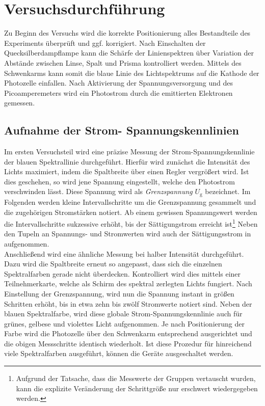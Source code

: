 \section{Versuchsdurchführung}
\label{sec:Versuchsdurchfuehrung}

Zu Beginn des Versuchs wird die korrekte Positionierung alles Bestandteile des Experiments überprüft und ggf. korrigiert. Nach Einschalten der Quecksilberdampflampe
kann die Schärfe der Linienspektren über Variation der Abstände zwischen Linse, Spalt und Prisma kontrolliert werden. Mittels des Schwenkarms kann somit 
die blaue Linie des Lichtspektrums auf die Kathode der Photozelle einfallen. Nach Aktivierung der Spannungsversorgung und des Picoamperemeters wird ein 
Photostrom durch die emittierten Elektronen gemessen. 

\subsection{Aufnahme der Strom- Spannungskennlinien}

Im ersten Versuchsteil wird eine präzise Messung der Strom-Spannungskennlinie der blauen Spektrallinie durchgeführt. Hierfür wird zunächst die Intensität des 
Lichts maximiert, indem die Spaltbreite über einen Regler vergrößert wird. Ist dies geschehen, so wird jene Spannung eingestellt, welche den Photostrom verschwinden
lässt. Diese Spannung wird als \emph{Grenzspannung} $U_\text{g}$ bezeichnet. Im Folgenden werden kleine Intervallschritte um die Grenzspannung gesammelt und 
die zugehörigen Stromstärken notiert. Ab einem gewissen Spannungswert werden die Intervallschritte sukzessive erhöht, bis der Sättigungstrom erreicht ist\footnote{
Aufgrund der Tatsache, dass die Messwerte der Gruppen vertauscht wurden, kann die explizite Veränderung der Schrittgröße nur erschwert wiedergegeben werden.}
Neben den Tupeln an Spannungs- und Stromwerten wird auch der Sättigungsstrom in aufgenommen.\\


\noindent Anschließend wird eine ähnliche Messung bei halber Intensität durchgeführt. Dazu wird die Spaltbreite erneut so angepasst, dass sich die einzelnen Spektralfarben
gerade nicht überdecken. Kontrolliert wird dies mittels einer Teilnehmerkarte, welche als Schirm des spektral zerlegten Lichts fungiert. Nach Einstellung 
der Grenzspannung, wird nun die Spannung instant in größen Schritten erhöht, bis in etwa zehn bis zwölf Stromwerte notiert sind. Neben der blauen Spektralfarbe, wird diese 
globale Strom-Spannungskennlinie auch für grünes, gelbese und violettes Licht aufgenommen. Je nach Positionierung der Farbe wird die Photozelle über den 
Schwenkarm entsprechend ausgerichtet und die obigen Messschritte identisch wiederholt. Ist diese Prozedur für hinreichend viele Spektralfarben ausgeführt, 
können die Geräte ausgeschaltet werden. 


